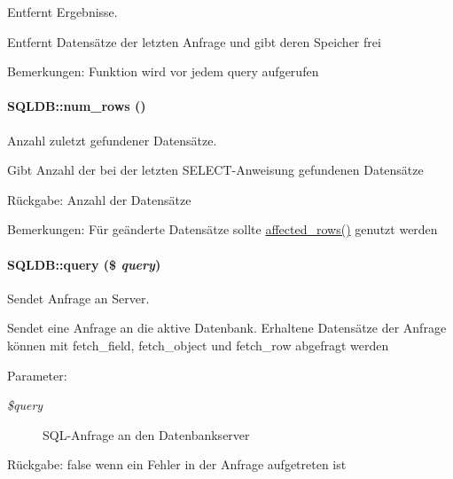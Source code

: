 Entfernt Ergebnisse. 

Entfernt Datensätze der letzten Anfrage und gibt deren Speicher frei \begin{Desc}
\item[Bemerkungen:]Funktion wird vor jedem query aufgerufen \end{Desc}
\hypertarget{classSQLDB_8b8f1f63b6172381e118b3cbc32f9f69}{
\paragraph[num\_\-rows]{\setlength{\rightskip}{0pt plus 5cm}SQLDB::num\_\-rows ()}\hfill}
\label{classSQLDB_8b8f1f63b6172381e118b3cbc32f9f69}


Anzahl zuletzt gefundener Datensätze. 

Gibt Anzahl der bei der letzten SELECT-Anweisung gefundenen Datensätze \begin{Desc}
\item[R\"{u}ckgabe:]Anzahl der Datensätze \end{Desc}
\begin{Desc}
\item[Bemerkungen:]Für geänderte Datensätze sollte \hyperlink{classSQLDB_2d1ec94a4c94e4a505ec37f944363954}{affected\_\-rows()} genutzt werden \end{Desc}
\hypertarget{classSQLDB_9a5af86138a3bb12ba443318a26103a1}{
\paragraph[query]{\setlength{\rightskip}{0pt plus 5cm}SQLDB::query (\$ {\em query})}\hfill}
\label{classSQLDB_9a5af86138a3bb12ba443318a26103a1}


Sendet Anfrage an Server. 

Sendet eine Anfrage an die aktive Datenbank. Erhaltene Datensätze der Anfrage können mit fetch\_\-field, fetch\_\-object und fetch\_\-row abgefragt werden \begin{Desc}
\item[Parameter:]
\begin{description}
\item[{\em \$query}]SQL-Anfrage an den Datenbankserver \end{description}
\end{Desc}
\begin{Desc}
\item[R\"{u}ckgabe:]false wenn ein Fehler in der Anfrage aufgetreten ist \end{Desc}


